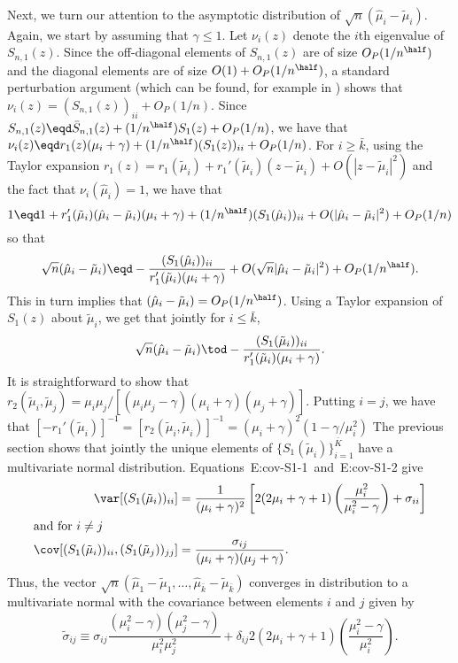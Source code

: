Next, we turn our attention to the asymptotic distribution of 
$\sqrt{n} (\hat \mu_i - \tilde \mu_i)$.  Again, we start by assuming that $\gamma \leq 1$.  Let $\nu_i(z)$ denote the $i$th
eigenvalue of $S_{n,1}(z)$.  Since the off-diagonal elements of $S_{n,1}(z)$ are
of size $O_P(1/n^\half)$ and the diagonal elements are of size
$O(1) + O_P(1/n^\half)$, a standard perturbation argument
(which can be found, for example in \cite{anderson1963atp}) shows that
$\nu_i(z) = (S_{n,1}(z))_{ii} + O_P(1/n)$.
Since $S_{n,1}(z) \eqd \bar S_{n,1}(z) + (1/n^\half) S_1(z) + O_P(1/n)$, we
have that 
$\nu_i(z) \eqd r_1(z) (\mu_i + \gamma) + (1/n^\half) (S_1(z))_{ii} + O_P(1/n)$.
For $i \geq \bar k$, using the Taylor expansion 
$r_1(z) = r_1 (\tilde \mu_i) + r_1'(\tilde \mu_i) (z - \tilde \mu_i) + O(|z - \tilde \mu_i|^2)$
and the fact that $\nu_i (\hat \mu_i) = 1$, we have that
\[
    1 \eqd 1 
            + r_1' (\tilde \mu_i)(\hat \mu_i - \tilde \mu_i)(\mu_i + \gamma) 
            + (1/n^\half) (S_1(\hat \mu_i))_{ii}
            + O(|\hat \mu_i - \tilde \mu_i|^2) 
            + O_P(1/n)
\]
so that
\[
    \sqrt{n} (\hat \mu_i - \tilde \mu_i)
    \eqd
        -\frac{(S_1(\hat \mu_i))_{ii}}
              {r_1' (\tilde \mu_i) (\mu_i + \gamma)}
        + O(\sqrt{n}|\hat \mu_i - \tilde \mu_i|^2)       
        + O_P(1/n^\half).
\]
This in turn implies that $(\hat \mu_i - \tilde \mu_i) = O_P(1/n^\half)$.
Using a Taylor expansion of $S_1(z)$ about $\tilde \mu_i$, we get that jointly
for $i \leq \bar k$,
\[
    \sqrt{n} (\hat \mu_i - \tilde \mu_i)
        \tod -\frac{(S_1(\tilde \mu_i))_{ii}}
                   {r_1' (\tilde \mu_i) (\mu_i + \gamma)}.
\]
It is straightforward to show that 
\(
    r_2(\tilde \mu_i, \tilde \mu_j) 
    =
    \mu_i \mu_j 
    / 
    [ (\mu_i \mu_j - \gamma) (\mu_i + \gamma) (\mu_j + \gamma) ].
\)
Putting $i = j$, we have that
\(
    \left[ -r_1'(\tilde \mu_i ) \right]^{-1}
    =
    \left[ r_2(\tilde \mu_i, \tilde \mu_i) \right]^{-1}
    =
    \left( \mu_i + \gamma \right)^2
    \left( 1 - \gamma/\mu_i^2 \right)
\)
The previous section shows that jointly the unique elements
of $\{ S_1(\tilde \mu_i) \}_{i=1}^{\bar K}$ have a multivariate normal distribution.
Equations~{E:cov-S1-1}~and~{E:cov-S1-2} give
\begin{align*}
    \var [ (S_1(\tilde \mu_i))_{ii} ]
        &= \frac{1}{(\mu_i + \gamma)^2}
           \left[
               2 ( 2 \mu_i + \gamma + 1 )
               \left(
                   \frac{\mu_i^2}{\mu_i^2 - \gamma}
               \right)
               +
               \sigma_{ii}
           \right] \\
\intertext{and for $i \neq j$}
    \cov [ (S_1(\tilde \mu_i))_{ii},  (S_1(\tilde \mu_j))_{jj}]
        &= \frac{\sigma_{ij}}
                {(\mu_i + \gamma)(\mu_j + \gamma)}.
\end{align*}
Thus, the vector 
\(
    \sqrt{n} 
    (\hat \mu_1 - \tilde \mu_1, 
     \ldots, 
     \hat \mu_{\bar k} - \tilde \mu_{\bar k}
    )
\)
converges in distribution to a multivariate normal with the covariance
between elements $i$ and $j$ given by
\[
    \tilde \sigma_{ij}
    \equiv
    \sigma_{ij} 
    \frac{(\mu_i^2 - \gamma)(\mu_j^2 - \gamma)}{\mu_i^2 \mu_j^2}
    +
    \delta_{ij}
    2(2\mu_i + \gamma + 1)
    \left(
        \frac{\mu_i^2 - \gamma}{\mu_i^2}
    \right).
\]

